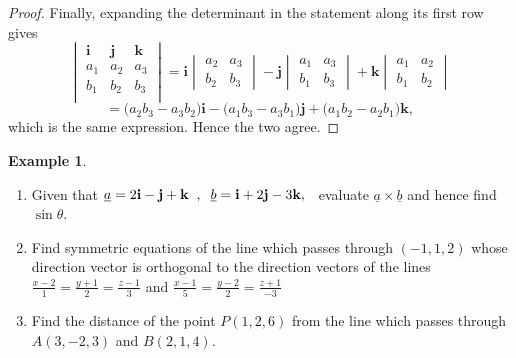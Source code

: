 \documentclass[11pt,a4paper]{article}
\theoremstyle{definition}
\newtheorem{exa}[thm]{Example}
\begin{document}
\begin{proof}
Finally, expanding the determinant in the statement along its first row gives
$$\begin{vmatrix}
\textbf{i} & \textbf{j} & \textbf{k}\\
a_1 & a_2 & a_3\\
b_1 & b_2 & b_3\\
\end{vmatrix}
= \textbf{i}\begin{vmatrix} a_2 & a_3\\ b_2 & b_3\end{vmatrix}
- \textbf{j}\begin{vmatrix} a_1 & a_3\\ b_1 & b_3\end{vmatrix}
+ \textbf{k}\begin{vmatrix} a_1 & a_2\\ b_1 & b_2\end{vmatrix}$$
$$= \big(a_2b_3 - a_3b_2\big)\textbf{i}
 - \big(a_1b_3 - a_3b_1\big)\textbf{j}
 + \big(a_1b_2 - a_2b_1\big)\textbf{k},$$
which is the same expression. Hence the two agree.
\end{proof}

\begin{exa}
\begin{enumerate}
\item Given that $\underline{a} = 2 \textbf{i} - \textbf{j} + \textbf{k}\hspace{0.2cm},\hspace{0.2cm} \underline{b} = \textbf{i} + 2\textbf{j} - 3\textbf{k},\hspace{0.2cm}$ evaluate $\underline{a} \times \underline{b}$ and hence find $\sin \theta$.
\item Find symmetric equations of the line which passes through $(-1,1,2)$ whose direction vector is orthogonal to the direction vectors of the lines $\displaystyle{\frac{x - 2}{1} = \frac{y + 1}{2} = \frac{z - 1}{3}}$ and $\displaystyle{\frac{x - 1}{5} = \frac{y - 2}{2} = \frac{z + 1}{-3}}$
\item Find the distance of the point $P(1,2,6)$ from the line which passes through $A(3,-2,3)$ and $B(2,1,4)$.
\end{enumerate}
\end{exa}
\end{document}
